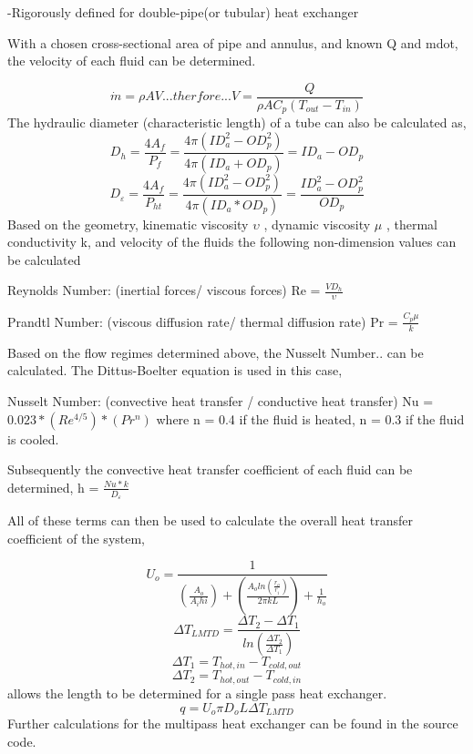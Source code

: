 \documentclass[heading.tex]{subfiles}
\begin{document}
-Rigorously defined for double-pipe(or tubular) heat exchanger

With a chosen cross-sectional area of pipe and annulus, and known Q and mdot, the velocity of each fluid can be determined.

\begin{equation*}
\dot{m} = \rho A V     ...therfore...        V  = \frac{Q} {\rho A C_{p} (T_{out} - T_{in})}
\end{equation*}
The hydraulic diameter (characteristic length) of a tube can also be calculated as,
\begin{equation*}
D_{h} = \frac{4 A_{f}} {P_{f}}  = \frac{4 \pi (ID_{a}^2-OD_{p}^2)} {4 \pi (ID_{a}+OD_{p})} = ID_{a}-OD_{p}
\end{equation*}
\begin{equation*}
D_{\varepsilon} = \frac{4 A_{f}} {P_{ht}}   =  \frac{4 \pi (ID_{a}^2-OD_{p}^2)} {4 \pi (ID_{a}*OD_{p})} = \frac{ID_{a}^2-OD_{p}^2}{OD_{p}}
\end{equation*}
Based on the geometry, kinematic viscosity  $\upsilon$ , dynamic viscosity  $\mu$ , thermal conductivity k, and velocity of the fluids the
following non-dimension values can be calculated

Reynolds Number: (inertial forces/ viscous forces)  Re = $\frac{V D_{h}} {\upsilon}$

Prandtl Number: (viscous diffusion rate/ thermal diffusion rate)  Pr = $\frac{C_{p} \mu} {k}$

Based on the flow regimes determined above, the Nusselt Number.. can be calculated. The Dittus-Boelter equation is used in this case,

Nusselt Number: (convective heat transfer / conductive heat transfer)  Nu = $0.023*(Re^{4/5})*(Pr^{n})$ where n = 0.4 if the fluid is heated, n = 0.3 if the fluid is cooled.

Subsequently the convective heat transfer coefficient of each fluid can be determined,  h = $\frac{Nu*k} {D_{\varepsilon}}$

All of these terms can then be used to calculate the overall heat transfer coefficient of the system,

\begin{equation*}
U_{o} = \frac{1} {(\frac{A_{o}}{A_{i}h{i}}) + (\frac{A_{o}ln(\frac{r_{o}}{r_{i}})}{2 \pi k L}) + \frac{1}{h_{o}}}
\end{equation*}
\begin{equation*}
\Delta {T}_{LMTD} = \frac{\Delta {T}_{2}-\Delta {T}_{1}}{ln(\frac{\Delta {T}_{2}}{\Delta {T}_{1}})}
\end{equation*}
\begin{equation*}
\Delta {T}_{1} = T_{hot,in} - T_{cold,out}
\end{equation*}
\begin{equation*}
\Delta {T}_{2} = T_{hot,out} - T_{cold,in}
\end{equation*}
allows the length to be determined for a single pass heat exchanger.
\begin{equation*}
q = U_{o} \pi D_{o} L \Delta {T}_{LMTD}
\end{equation*}
Further calculations for the multipass heat exchanger can be found in the source code.
\end{document}
